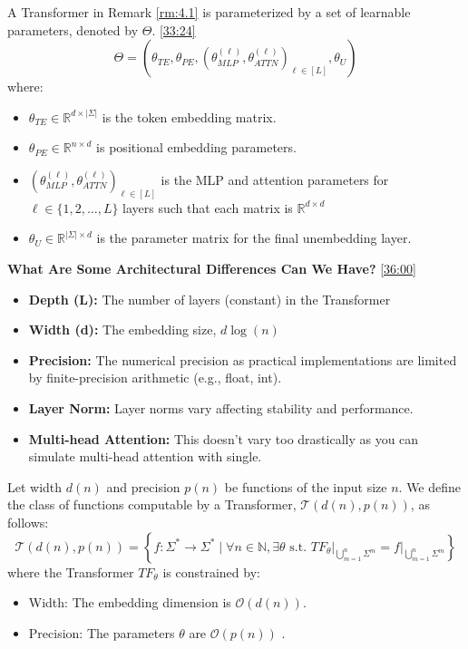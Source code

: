 \documentclass[12pt, twoside]{article}
\begin{document}
\begin{definition}
    A Transformer in Remark \ref{rm:4.1} is parameterized by a set of learnable parameters, denoted by $\Theta$. \href{https://youtu.be/hzkRibaG3xU?si=9N9K0oWPkgmzpGCm&t=2004}{[33:24]}
    $$
    \Theta = \left( \theta_{TE}, \theta_{PE}, \left( \theta_{MLP}^{(\ell)}, \theta_{ATTN}^{(\ell)} \right)_{\ell \in [L]}, \theta_U \right)
    $$
    where:
    \begin{itemize}
        \item $\theta_{TE} \in \mathbb{R}^{d \times |\Sigma|}$ is the token embedding matrix.
        \item $\theta_{PE} \in \mathbb{R}^{n \times d}$ is positional embedding parameters.
        \item $\left( \theta_{MLP}^{(\ell)}, \theta_{ATTN}^{(\ell)} \right)_{\ell \in [L]}$ is the MLP and attention parameters for $\ell \in \{ 1,2,\dots,L\}$ layers such that each matrix is $\mathbb{R}^{d\times d}$
        \item $\theta_U \in \mathbb{R}^{|\Sigma| \times d}$ is the parameter matrix for the final unembedding layer.
    \end{itemize}
\end{definition}

\textbf{What Are Some Architectural Differences Can We Have?} \href{https://youtu.be/hzkRibaG3xU?si=LqlnSDeyf_76L-g-&t=2159}{[36:00]}

\begin{itemize}
    \item \textbf{Depth (L):} The number of layers (constant) in the Transformer
    \item \textbf{Width (d):} The embedding size, $d \log(n)$
    \item \textbf{Precision:} The numerical precision as practical implementations are limited by finite-precision arithmetic (e.g., float, int).
    \item \textbf{Layer Norm:} Layer norms vary affecting stability and performance.
    \item \textbf{Multi-head Attention:} This doesn't vary too drastically as you can simulate multi-head attention with single.
\end{itemize}

\begin{definition}
    Let width $d(n)$ and precision $p(n)$ be functions of the input size $n$. We define the class of functions computable by a Transformer, $\mathcal{T}(d(n), p(n))$, as follows:
    $$
    \mathcal{T}(d(n), p(n)) = \left\{
    f: \Sigma^* \to \Sigma^* \mid \forall n \in \mathbb{N}, \exists \theta \text{ s.t. }
    \left. TF_\theta \right|_{\bigcup_{m=1}^n \Sigma^m} = \left. f \right|_{\bigcup_{m=1}^n \Sigma^m}
    \right\}
    $$
    where the Transformer $TF_\theta$ is constrained by:
    \begin{itemize}
        \item Width: The embedding dimension is $\mathcal{O}(d(n))$.
        \item Precision: The parameters $\theta$ are $\mathcal{O}(p(n))$ .
    \end{itemize}
\end{definition}
\end{document}
